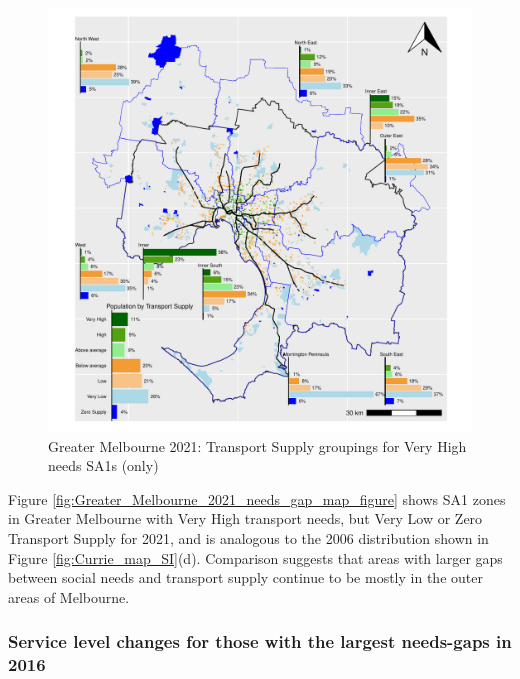\documentclass[preprint, 3p,
authoryear]{elsarticle} %
\begin{document}
\begin{figure}
\centering
\includegraphics{ReynoldsCurrieQu2024_files/figure-latex/Greater_Melbourne_2021_needs_gap_map_figure-1.pdf}
\caption{Greater Melbourne 2021: Transport Supply groupings for Very
High needs SA1s (only)}
\end{figure}

Figure \ref{fig:Greater_Melbourne_2021_needs_gap_map_figure} shows SA1
zones in Greater Melbourne with Very High transport needs, but Very Low
or Zero Transport Supply for 2021, and is analogous to the 2006
distribution shown in Figure \ref{fig:Currie_map_SI}(d). Comparison
suggests that areas with larger gaps between social needs and transport
supply continue to be mostly in the outer areas of Melbourne.

\subsubsection{Service level changes for those with the largest
needs-gaps in
2016}\label{service-level-changes-for-those-with-the-largest-needs-gaps-in-2016}
\end{document}
